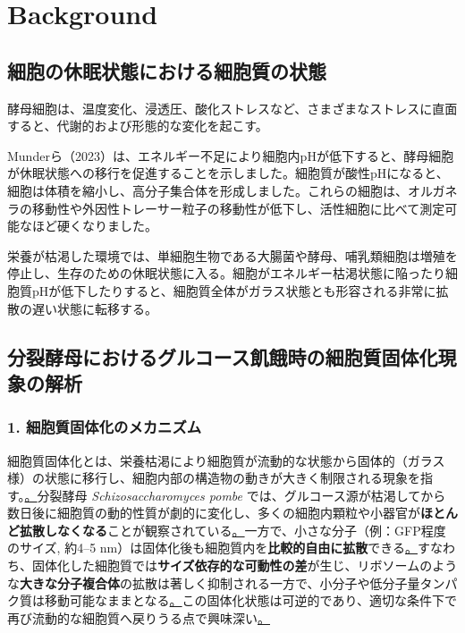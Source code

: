 \chapter{Background}

\section{細胞の休眠状態における細胞質の状態}

酵母細胞は、温度変化、浸透圧、酸化ストレスなど、さまざまなストレスに直面すると、代謝的および形態的な変化を起こす。

Munderら（2023）は、エネルギー不足により細胞内pHが低下すると、酵母細胞が休眠状態への移行を促進することを示しました。細胞質が酸性pHになると、細胞は体積を縮小し、高分子集合体を形成しました。これらの細胞は、オルガネラの移動性や外因性トレーサー粒子の移動性が低下し、活性細胞に比べて測定可能なほど硬くなりました。

栄養が枯渇した環境では、単細胞生物である大腸菌や酵母、哺乳類細胞は増殖を停止し、生存のための休眠状態に入る。細胞がエネルギー枯渇状態に陥ったり細胞質pHが低下したりすると、細胞質全体がガラス状態とも形容される非常に拡散の遅い状態に転移する。


\section{分裂酵母におけるグルコース飢餓時の細胞質固体化現象の解析}

\subsection{1. 細胞質固体化のメカニズム}

細胞質固体化とは、栄養枯渇により細胞質が流動的な状態から固体的（ガラス様）の状態に移行し、細胞内部の構造物の動きが大きく制限される現象を指す。\href{https://pmc.ncbi.nlm.nih.gov/articles/PMC6857596/\#:~:text=run\%20out\%20of\%20nutrients,2016\%20\%3B\%20\%2043}。分裂酵母 \textit{Schizosaccharomyces pombe} では、グルコース源が枯渇してから数日後に細胞質の動的性質が劇的に変化し、多くの細胞内顆粒や小器官が\textbf{ほとんど拡散しなくなる}ことが観察されている\href{https://pmc.ncbi.nlm.nih.gov/articles/PMC6857596/\#:~:text=run\%20out\%20of\%20nutrients,2016\%20\%3B\%20\%2043}。一方で、小さな分子（例：GFP程度のサイズ, 約4–5 nm）は固体化後も細胞質内を\textbf{比較的自由に拡散}できる\href{https://pmc.ncbi.nlm.nih.gov/articles/PMC6857596/\#:~:text=run\%20out\%20of\%20nutrients,2016\%20\%3B\%20\%2043}。すなわち、固体化した細胞質では\textbf{サイズ依存的な可動性の差}が生じ、リボソームのような\textbf{大きな分子複合体}の拡散は著しく抑制される一方で、小分子や低分子量タンパク質は移動可能なままとなる\href{https://pmc.ncbi.nlm.nih.gov/articles/PMC11214080/\#:~:text=spores\%20and\%20uncovered\%20signaling\%20pathways,such\%20as\%20ribosomes\%2C\%20is\%20restricted}。この固体化状態は可逆的であり、適切な条件下で再び流動的な細胞質へ戻りうる点で興味深い\href{https://pmc.ncbi.nlm.nih.gov/articles/PMC6857596/\#:~:text=Cells\%20depend\%20on\%20a\%20highly,dependent\%20manner.\%20We}\href{https://pmc.ncbi.nlm.nih.gov/articles/PMC6857596/\#:~:text=provide\%20experimental\%20evidence\%20that\%2C\%20in,cellular\%20architecture\%20in\%20dormant\%20cells}。

